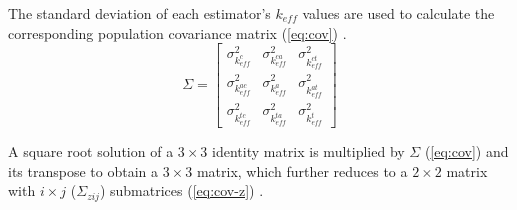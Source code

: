 \noindent The standard deviation of each estimator's $k_{eff}$ values are used to calculate the corresponding population covariance matrix (\ref{eq:cov}) \cite{urbatsch}.
%
\begin{equation}
  \label{eq:cov}
  \Sigma =
  \left[
  \begin{matrix}
    \sigma_{k_{eff}^{c}}^{2}  & \sigma_{k_{eff}^{ca}}^{2} & \sigma_{k_{eff}^{ct}}^{2} \\
    \sigma_{k_{eff}^{ac}}^{2} & \sigma_{k_{eff}^{a}}^{2}  & \sigma_{k_{eff}^{at}}^{2} \\
    \sigma_{k_{eff}^{tc}}^{2} & \sigma_{k_{eff}^{ta}}^{2} & \sigma_{k_{eff}^{t}}^{2}
  \end{matrix}
  \right]
\end{equation}

\noindent A square root solution of a $3 \times 3$ identity matrix is multiplied by $\Sigma$ (\ref{eq:cov}) and its transpose to obtain a $3 \times 3$ matrix, which further reduces to a $2 \times 2$ matrix with $i \times j$ ($\Sigma_{zij}$) submatrices (\ref{eq:cov-z}) \cite{urbatsch}.
%
